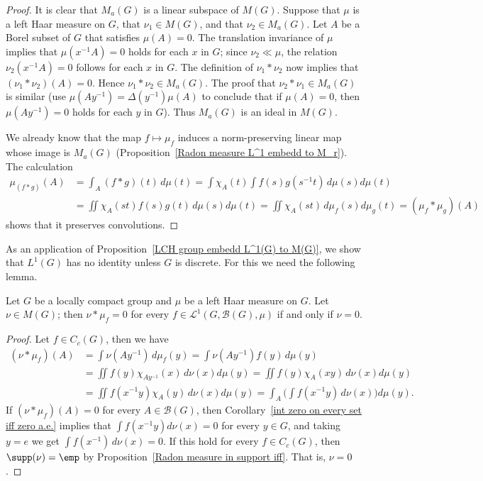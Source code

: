 \begin{proof}
It is clear that $M_a(G)$ is a linear subspace of $M(G)$. Suppose that $\mu$ is a left Haar measure on $G$, that $\nu_1\in M(G)$, and that $\nu_2\in M_a(G)$. Let $A$ be a Borel subset of $G$ that satisfies $\mu(A)=0$. The translation invariance of $\mu$ implies that $\mu(x^{-1}A)=0$ holds for each $x$ in $G$; since $\nu_2\ll\mu$, the relation $\nu_2(x^{-1}A)=0$ follows for each $x$ in $G$. The definition of $\nu_1\ast\nu_2$ now implies that $(\nu_1\ast\nu_2)(A)=0$. Hence $\nu_1\ast\nu_2\in M_a(G)$. The proof that $\nu_2\ast\nu_1\in M_a(G)$ is similar (use $\mu(Ay^{-1})=\Delta(y^{-1})\mu(A)$ to conclude that if $\mu(A)=0$, then $\mu(Ay^{-1})=0$ holds for each $y$ in $G$). Thus $M_a(G)$ is an ideal in $M(G)$.\par
We already know that the map $f\mapsto\mu_f$ induces a norm-preserving linear map whose image is $M_a(G)$ (Proposition~\ref{Radon measure L^1 embedd to M_r}). The calculation
\begin{align*}
\mu_{(f\ast g)}(A)&=\int_A(f\ast g)(t)\,d\mu(t)=\int\chi_A(t)\int f(s)g(s^{-1}t)\,d\mu(s)d\mu(t)\\
&=\iint\chi_A(st)f(s)g(t)\,d\mu(s)d\mu(t)=\iint\chi_A(st)\,d\mu_f(s)d\mu_g(t)=(\mu_f\ast\mu_g)(A)
\end{align*}
shows that it preserves convolutions.
\end{proof}
As an application of Proposition~\ref{LCH group embedd L^1(G) to M(G)}, we show that $L^1(G)$ has no identity unless $G$ is discrete. For this we need the following lemma.
\begin{lemma}\label{LCH group M(G) variation lemma}
Let $G$ be a locally compact group and $\mu$ be a left Haar measure on $G$. Let $\nu\in M(G)$; then $\nu\ast\mu_f=0$ for every $f\in\mathcal{L}^1(G,\mathcal{B}(G),\mu)$ if and only if $\nu=0$.
\end{lemma}
\begin{proof}
Let $f\in C_c(G)$, then we have
\begin{align*}
(\nu\ast\mu_f)(A)&=\int\nu(Ay^{-1})\,d\mu_f(y)=\int\nu(Ay^{-1})f(y)\,d\mu(y)\\
&=\iint f(y)\chi_{Ay^{-1}}(x)\,d\nu(x)d\mu(y)=\iint f(y)\chi_{A}(xy)\,d\nu(x)d\mu(y)\\
&=\iint f(x^{-1}y)\chi_A(y)\,d\nu(x)d\mu(y)=\int_A\Big(\int f(x^{-1}y)\,d\nu(x)\Big)d\mu(y).
\end{align*}
If $(\nu\ast\mu_f)(A)=0$ for every $A\in\mathcal{B}(G)$, then Corollary~\ref{int zero on every set iff zero a.e.} implies that $\int f(x^{-1}y)d\nu(x)=0$ for every $y\in G$, and taking $y=e$ we get $\int f(x^{-1})\,d\nu(x)=0$. If this hold for every $f\in C_c(G)$, then $\supp(\nu)=\emp$ by Proposition~\ref{Radon measure in support iff}. That is, $\nu=0$.
\end{proof}
